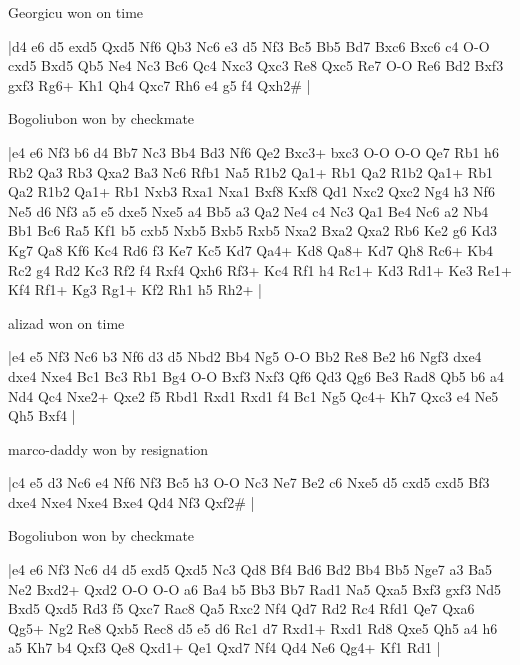 \showboard

Georgicu won on time

\makegametitle
|d4 e6 d5 exd5 Qxd5 Nf6 Qb3 Nc6 e3 d5 Nf3 Bc5 Bb5 Bd7 Bxc6 Bxc6 c4 O-O cxd5 Bxd5 Qb5 Ne4 Nc3 Bc6 Qc4 Nxc3 Qxc3 Re8 Qxc5 Re7 O-O Re6 Bd2 Bxf3 gxf3 Rg6+ Kh1 Qh4 Qxc7 Rh6 e4 g5 f4 Qxh2\#  |

\showboard

Bogoliubon won by checkmate

\makegametitle
|e4 e6 Nf3 b6 d4 Bb7 Nc3 Bb4 Bd3 Nf6 Qe2 Bxc3+ bxc3 O-O O-O Qe7 Rb1 h6 Rb2 Qa3 Rb3 Qxa2 Ba3 Nc6 Rfb1 Na5 R1b2 Qa1+ Rb1 Qa2 R1b2 Qa1+ Rb1 Qa2 R1b2 Qa1+ Rb1 Nxb3 Rxa1 Nxa1 Bxf8 Kxf8 Qd1 Nxc2 Qxc2 Ng4 h3 Nf6 Ne5 d6 Nf3 a5 e5 dxe5 Nxe5 a4 Bb5 a3 Qa2 Ne4 c4 Nc3 Qa1 Be4 Nc6 a2 Nb4 Bb1 Bc6 Ra5 Kf1 b5 cxb5 Nxb5 Bxb5 Rxb5 Nxa2 Bxa2 Qxa2 Rb6 Ke2 g6 Kd3 Kg7 Qa8 Kf6 Kc4 Rd6 f3 Ke7 Kc5 Kd7 Qa4+ Kd8 Qa8+ Kd7 Qh8 Rc6+ Kb4 Rc2 g4 Rd2 Kc3 Rf2 f4 Rxf4 Qxh6 Rf3+ Kc4 Rf1 h4 Rc1+ Kd3 Rd1+ Ke3 Re1+ Kf4 Rf1+ Kg3 Rg1+ Kf2 Rh1 h5 Rh2+  |

\showboard

alizad won on time

\makegametitle
|e4 e5 Nf3 Nc6 b3 Nf6 d3 d5 Nbd2 Bb4 Ng5 O-O Bb2 Re8 Be2 h6 Ngf3 dxe4 dxe4 Nxe4 Bc1 Bc3 Rb1 Bg4 O-O Bxf3 Nxf3 Qf6 Qd3 Qg6 Be3 Rad8 Qb5 b6 a4 Nd4 Qc4 Nxe2+ Qxe2 f5 Rbd1 Rxd1 Rxd1 f4 Bc1 Ng5 Qc4+ Kh7 Qxc3 e4 Ne5 Qh5 Bxf4  |

\showboard

marco-daddy won by resignation

\makegametitle
|c4 e5 d3 Nc6 e4 Nf6 Nf3 Bc5 h3 O-O Nc3 Ne7 Be2 c6 Nxe5 d5 cxd5 cxd5 Bf3 dxe4 Nxe4 Nxe4 Bxe4 Qd4 Nf3 Qxf2\#  |

\showboard

Bogoliubon won by checkmate

\makegametitle
|e4 e6 Nf3 Nc6 d4 d5 exd5 Qxd5 Nc3 Qd8 Bf4 Bd6 Bd2 Bb4 Bb5 Nge7 a3 Ba5 Ne2 Bxd2+ Qxd2 O-O O-O a6 Ba4 b5 Bb3 Bb7 Rad1 Na5 Qxa5 Bxf3 gxf3 Nd5 Bxd5 Qxd5 Rd3 f5 Qxc7 Rac8 Qa5 Rxc2 Nf4 Qd7 Rd2 Rc4 Rfd1 Qe7 Qxa6 Qg5+ Ng2 Re8 Qxb5 Rec8 d5 e5 d6 Rc1 d7 Rxd1+ Rxd1 Rd8 Qxe5 Qh5 a4 h6 a5 Kh7 b4 Qxf3 Qe8 Qxd1+ Qe1 Qxd7 Nf4 Qd4 Ne6 Qg4+ Kf1 Rd1  |

